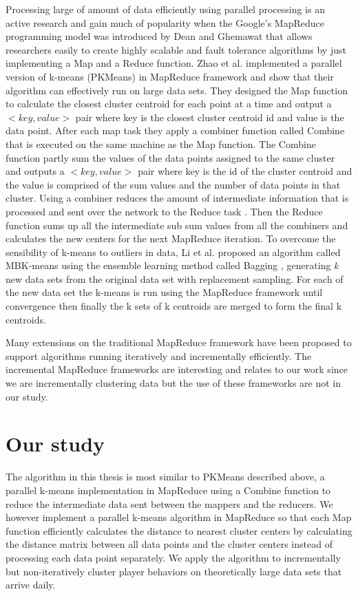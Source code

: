 Processing large of amount of data efficiently using parallel processing is an active research and gain much of popularity when the Google's MapReduce programming model was introduced by Dean and Ghemawat \citep{Dean:2004} that allows researchers easily to create highly scalable and fault tolerance algorithms by just implementing a Map and a Reduce function. Zhao et al. \citep{Zhao:2009} implemented a parallel version of k-means (PKMeans) in MapReduce framework and show that their algorithm can effectively run on large data sets. They designed the Map function to calculate the closest cluster centroid for each point at a time and output a $<key, value>$ pair where key is the closest cluster centroid id and value is the data point. After each map task they apply a combiner function called Combine that is executed on the same machine as the Map function. The Combine function partly sum the values of the data points assigned to the same cluster and outputs a $<key, value>$ pair where key is the id of the cluster centroid and the value is comprised of the sum values and the number of data points in that cluster. Using a combiner reduces the amount of intermediate information that is processed and sent over the network to the Reduce task \citep{Dean:2004, Zhao:2009}. Then the Reduce function sums up all the intermediate sub sum values from all the combiners and calculates the new centers for the next MapReduce iteration. To overcome the sensibility of k-means to outliers in data, Li et al. \citep{Li:2011} proposed an algorithm called MBK-means using the ensemble learning method called Bagging \citep{Breiman:1996}, generating \textit{k} new data sets from the original data set with replacement sampling. For each of the new data set the k-means is run using the MapReduce framework until convergence then finally the k sets of k centroids are merged to form the final k centroids.

Many extensions on the traditional MapReduce framework have been proposed to support algorithms running iteratively \citep{Condie:2010HadoopOnline, Ekanayake:2010Twister, Zaharia:2010Spark, Bu:2010HaLoop, Bu:2012HaLoop, Yan:2012IncMr} and incrementally \citep{Bhatotia:2011Incoop, Yan:2012IncMr, Bhatotia:2012Slider} efficiently. The incremental MapReduce frameworks are interesting and relates to our work since we are incrementally clustering data but the use of these frameworks are not in our study.

\section{Our study}
The algorithm in this thesis is most similar to PKMeans \citep{Zhao:2009} described above, a parallel k-means implementation in MapReduce using a Combine function to reduce the intermediate data sent between the mappers and the reducers. We however implement a parallel k-means algorithm in MapReduce so that each Map function efficiently calculates the distance to nearest cluster centers by calculating the distance matrix between all data points and the cluster centers instead of processing each data point separately. We apply the algorithm to incrementally but non-iteratively cluster player behaviors on theoretically large data sets that arrive daily. 

